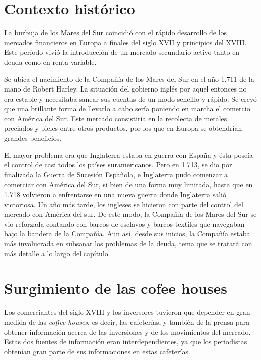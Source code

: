 \section{Contexto histórico}

La burbuja de los Mares del Sur coincidió con el rápido desarrollo de los mercados financieros en Europa a finales del siglo XVII y principios del XVIII. Este período vivió la introducción de un mercado secundario activo tanto en deuda como en renta variable. 

Se ubica el nacimiento de la Compañía de los Mares del Sur en el año 1.711 de la mano de Robert Harley. La situación del gobierno inglés por aquel entonces no era estable y necesitaba sanear sus cuentas de un modo sencillo y rápido. Se creyó que una brillante forma de llevarlo a cabo sería poniendo en marcha el comercio con América del Sur. Este mercado consistiría en la recolecta de metales preciados y pieles entre otros productos, por los que en Europa se obtendrían grandes beneficios.

El mayor problema era que Inglaterra estaba en guerra con España y ésta poseía el control de casi todos los países suramericanos. Pero en 1.713, se dio por finalizada la Guerra de Sucesión Española, e Inglaterra pudo comenzar a comerciar con América del Sur, si bien de una forma muy limitada, hasta que en 1.718 volvieron a enfrentarse en una nueva guerra donde Inglaterra salió victoriosa. Un año más tarde, los ingleses se hicieron con parte del control del mercado con América del sur. De este modo, la Compañía de los Mares del Sur se vio reforzada contando con barcos de esclavos y barcos textiles que navegaban bajo la bandera de la Compañía. Aun así, desde sus inicios, la Compañía estaba más involucrada en subsanar los problemas de la deuda, tema que se tratará con más detalle a lo largo del capítulo. 

\section{Surgimiento de las cofee houses}

Los comerciantes del siglo XVIII y los inversores tuvieron que depender en gran medida de las \emph{coffee houses}, es decir, las cafeterías, y también de la prensa para obtener información acerca de las inversiones y de los movimientos del mercado. Estas dos fuentes de información eran interdependientes, ya que los periodistas obtenían gran parte de sus informaciones en estas cafeterías.

